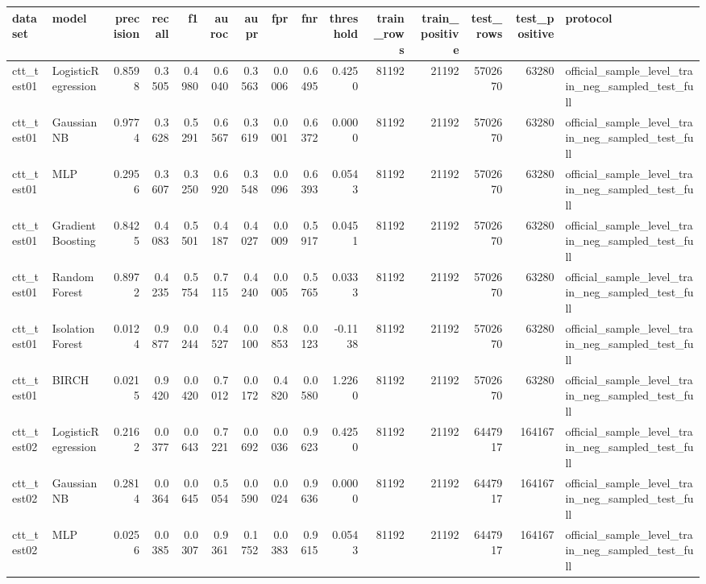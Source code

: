 \begin{tabular}{llrrrrrrrrrrrrl}
\toprule
dataset & model & precision & recall & f1 & auroc & aupr & fpr & fnr & threshold & train\_rows & train\_positive & test\_rows & test\_positive & protocol \\
\midrule
ctt\_test01 & LogisticRegression & 0.8598 & 0.3505 & 0.4980 & 0.6040 & 0.3563 & 0.0006 & 0.6495 & 0.4250 & 81192 & 21192 & 5702670 & 63280 & official\_sample\_level\_train\_neg\_sampled\_test\_full \\
ctt\_test01 & GaussianNB & 0.9774 & 0.3628 & 0.5291 & 0.6567 & 0.3619 & 0.0001 & 0.6372 & 0.0000 & 81192 & 21192 & 5702670 & 63280 & official\_sample\_level\_train\_neg\_sampled\_test\_full \\
ctt\_test01 & MLP & 0.2956 & 0.3607 & 0.3250 & 0.6920 & 0.3548 & 0.0096 & 0.6393 & 0.0543 & 81192 & 21192 & 5702670 & 63280 & official\_sample\_level\_train\_neg\_sampled\_test\_full \\
ctt\_test01 & GradientBoosting & 0.8425 & 0.4083 & 0.5501 & 0.4187 & 0.4027 & 0.0009 & 0.5917 & 0.0451 & 81192 & 21192 & 5702670 & 63280 & official\_sample\_level\_train\_neg\_sampled\_test\_full \\
ctt\_test01 & RandomForest & 0.8972 & 0.4235 & 0.5754 & 0.7115 & 0.4240 & 0.0005 & 0.5765 & 0.0333 & 81192 & 21192 & 5702670 & 63280 & official\_sample\_level\_train\_neg\_sampled\_test\_full \\
ctt\_test01 & IsolationForest & 0.0124 & 0.9877 & 0.0244 & 0.4527 & 0.0100 & 0.8853 & 0.0123 & -0.1138 & 81192 & 21192 & 5702670 & 63280 & official\_sample\_level\_train\_neg\_sampled\_test\_full \\
ctt\_test01 & BIRCH & 0.0215 & 0.9420 & 0.0420 & 0.7012 & 0.0172 & 0.4820 & 0.0580 & 1.2260 & 81192 & 21192 & 5702670 & 63280 & official\_sample\_level\_train\_neg\_sampled\_test\_full \\
ctt\_test02 & LogisticRegression & 0.2162 & 0.0377 & 0.0643 & 0.7221 & 0.0692 & 0.0036 & 0.9623 & 0.4250 & 81192 & 21192 & 6447917 & 164167 & official\_sample\_level\_train\_neg\_sampled\_test\_full \\
ctt\_test02 & GaussianNB & 0.2814 & 0.0364 & 0.0645 & 0.5054 & 0.0590 & 0.0024 & 0.9636 & 0.0000 & 81192 & 21192 & 6447917 & 164167 & official\_sample\_level\_train\_neg\_sampled\_test\_full \\
ctt\_test02 & MLP & 0.0256 & 0.0385 & 0.0307 & 0.9361 & 0.1752 & 0.0383 & 0.9615 & 0.0543 & 81192 & 21192 & 6447917 & 164167 & official\_sample\_level\_train\_neg\_sampled\_test\_full \\

\end{tabular}
